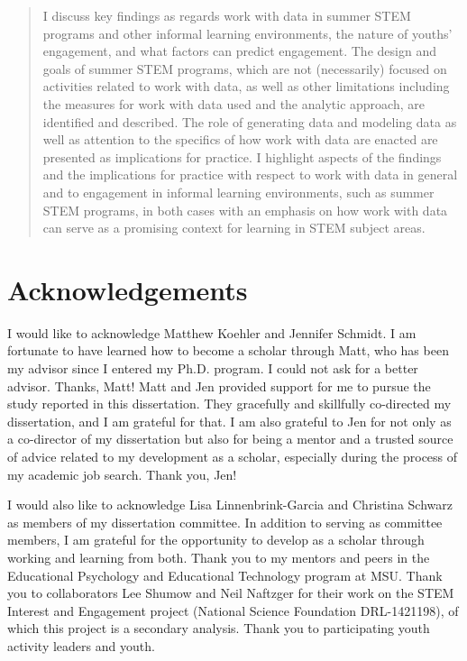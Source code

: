 \documentclass[]{msu-thesis}
\theoremstyle{definition}
\theoremstyle{definition}
\theoremstyle{definition}
\theoremstyle{remark}
\begin{document}
\begin{abstract}
I discuss key findings as regards work with data in summer STEM programs and other informal learning environments, the nature of youths' engagement, and what factors can predict engagement. The design and goals of summer STEM programs, which are not (necessarily) focused on activities related to work with data, as well as other limitations including the measures for work with data used and the analytic approach, are identified and described. The role of generating data and modeling data as well as attention to the specifics of how work with data are enacted are presented as implications for practice. I highlight aspects of the findings and the implications for practice with respect to work with data in general and to engagement in informal learning environments, such as summer STEM programs, in both cases with an emphasis on how work with data can serve as a promising context for learning in STEM subject areas.
\end{abstract}

\clearpage

\makecopyrightpage

%
\makededicationpage
%
\clearpage

\chapter*{Acknowledgements}
\DoubleSpacing %
I would like to acknowledge Matthew Koehler and Jennifer Schmidt. I am fortunate to have learned how to become a scholar through Matt, who has been my advisor since I entered my Ph.D. program. I could not ask for a better advisor. Thanks, Matt! Matt and Jen provided support for me to pursue the study reported in this dissertation. They gracefully and skillfully co-directed my dissertation, and I am grateful for that. I am also grateful to Jen for  not only as a co-director of my dissertation but also for being a mentor and a trusted source of advice related to my development as a scholar, especially during the process of my academic job search. Thank you, Jen!

I would also like to acknowledge Lisa Linnenbrink-Garcia and Christina Schwarz as members of my dissertation committee. In addition to serving as committee members, I am grateful for the opportunity to develop as a scholar through working and learning from both. Thank you to my mentors and peers in the Educational Psychology and Educational Technology program at MSU. Thank you to collaborators Lee Shumow and Neil Naftzger for their work on the STEM Interest and Engagement project (National Science Foundation DRL-1421198), of which this project is a secondary analysis. Thank you to participating youth activity leaders and youth.
\end{document}
